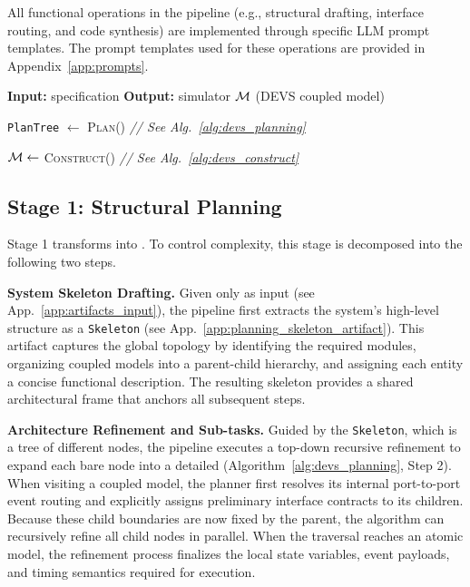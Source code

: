 All functional operations in the pipeline (e.g., structural drafting, interface routing, and code synthesis) are implemented through specific LLM prompt templates. The prompt templates used for these operations are provided in Appendix~\ref{app:prompts}.

\begin{algorithm}[h]
\caption{\methodname{} Pseudocode}
\label{alg:devs_main}
\begin{algorithmic}[1]
\State \textbf{Input:} specification \spec
\State \textbf{Output:} simulator $\mathcal{M}$ (DEVS coupled model)

\State \texttt{PlanTree} $\leftarrow$ \textsc{Plan}(\spec) \textit{// See Alg.~\ref{alg:devs_planning}}

\State $\mathcal{M} \leftarrow$ \textsc{Construct}(\plantree) \textit{// See Alg.~\ref{alg:devs_construct}}

\end{algorithmic}
\end{algorithm}

\subsection{Stage 1: Structural Planning}
Stage 1 transforms \spec{} into \plantree{}. 
To control complexity, this stage is decomposed into the following two steps.

\noindent\textbf{System Skeleton Drafting.} 
Given only \spec{} as input (see App.~\ref{app:artifacts_input}), the pipeline first extracts the system's high-level structure as a \texttt{Skeleton} (see App.~\ref{app:planning_skeleton_artifact}). This artifact captures the global topology by identifying the required modules, organizing coupled models into a parent-child hierarchy, and assigning each entity a concise functional description. The resulting skeleton provides a shared architectural frame that anchors all subsequent steps.

\noindent\textbf{Architecture Refinement and Sub-tasks.}
Guided by the \texttt{Skeleton}, which is a tree of different nodes, the pipeline executes a top-down recursive refinement to expand each bare node into a detailed \modelplan{} (Algorithm~\ref{alg:devs_planning}, Step 2). 
When visiting a coupled model, the planner first resolves its internal port-to-port event routing and explicitly assigns preliminary interface contracts to its children. Because these child boundaries are now fixed by the parent, the algorithm can recursively refine all child nodes in parallel. When the traversal reaches an atomic model, the refinement process finalizes the local state variables, event payloads, and timing semantics required for execution.

